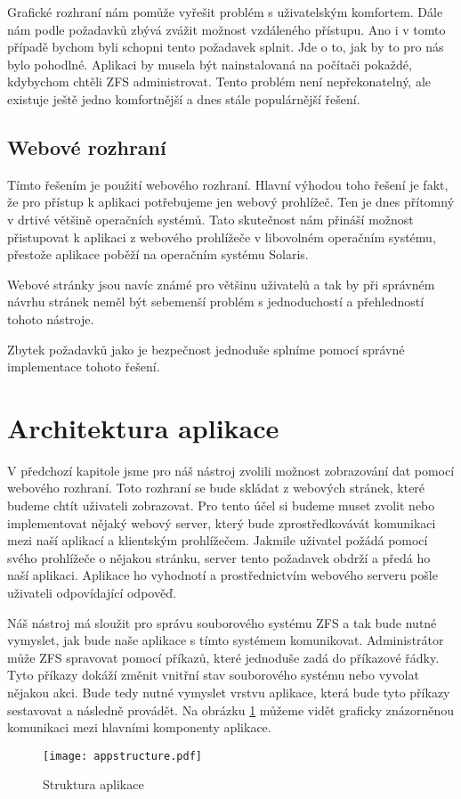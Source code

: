     Grafické rozhraní nám pomůže vyřešit problém s uživatelským komfortem. Dále nám podle požadavků zbývá zvážit možnost vzdáleného přístupu. Ano i v tomto případě bychom byli schopni tento požadavek splnit. Jde o to, jak by to pro nás bylo pohodlné. Aplikaci by musela být nainstalovaná na počítači pokaždé, kdybychom chtěli ZFS administrovat. Tento problém není nepřekonatelný, ale existuje ještě jedno komfortnější a dnes stále populárnější řešení.
    \subsection{Webové rozhraní}
    Tímto řešením je použití webového rozhraní. Hlavní výhodou toho řešení je fakt, že pro přístup k aplikaci potřebujeme jen webový prohlížeč. Ten je dnes přítomný v drtivé většině operačních systémů. Tato skutečnost nám přináší možnost přistupovat k aplikaci z webového prohlížeče v libovolném operačním systému, přestože aplikace poběží na operačním systému Solaris.

    Webové stránky jsou navíc známé pro většinu uživatelů a tak by při správném návrhu stránek neměl být sebemenší problém s jednoduchostí a přehledností tohoto nástroje.

    Zbytek požadavků jako je bezpečnost jednoduše splníme pomocí správné implementace tohoto řešení.
\section{Architektura aplikace}
V předchozí kapitole jsme pro náš nástroj zvolili možnost zobrazování dat pomocí webového rozhraní. Toto rozhraní se bude skládat z webových stránek, které budeme chtít uživateli zobrazovat. Pro tento účel si budeme muset zvolit nebo implementovat nějaký webový server, který bude zprostředkovávát komunikaci mezi naší aplikací a klientským prohlížečem. Jakmile uživatel požádá pomocí svého prohlížeče o nějakou stránku, server tento požadavek obdrží a předá ho naší aplikaci. Aplikace ho vyhodnotí a prostřednictvím webového serveru pošle uživateli odpovídající odpověď.

Náš nástroj má sloužit pro správu souborového systému ZFS a tak bude nutné vymyslet, jak bude naše aplikace s tímto systémem komunikovat. Administrátor může ZFS spravovat pomocí příkazů, které jednoduše zadá do příkazové řádky. Tyto příkazy dokáží změnit vnitřní stav souborového systému nebo vyvolat nějakou akci. Bude tedy nutné vymyslet vrstvu aplikace, která bude tyto příkazy sestavovat a následně provádět. Na obrázku \ref{architecture} můžeme vidět graficky znázorněnou komunikaci mezi hlavními komponenty aplikace.
\begin{figure}[h]
        \caption{Struktura aplikace}
        \label{architecture}
        \centering
        \texttt{[image: appstructure.pdf]}
\end{figure}
